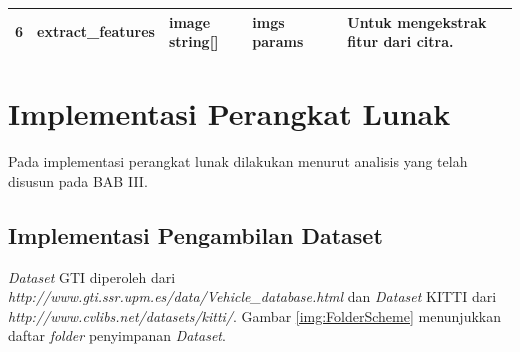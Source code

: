 \begin{small}
\begin{longtable}{|p{0.4cm}|p{2.6cm}|p{2cm}|p{2.5cm}|p{1.5cm}|p{4.5cm}|}
		\hline
		6 & extract\_features & image \newline string[] & imgs \newline params &  & Untuk mengekstrak fitur dari citra.\\
		\hline
	\end{longtable}
\end{small}

\section{Implementasi Perangkat Lunak}
Pada implementasi perangkat lunak dilakukan menurut analisis yang telah disusun
pada BAB III.\\

\subsection{Implementasi Pengambilan Dataset}
\textit{Dataset} GTI diperoleh dari \textit{http://www.gti.ssr.upm.es/data/Vehicle\_database.html} dan \textit{Dataset} KITTI dari \textit{http://www.cvlibs.net/datasets/kitti/}. Gambar \ref{img:FolderScheme} menunjukkan daftar \textit{folder} penyimpanan \textit{Dataset}.


